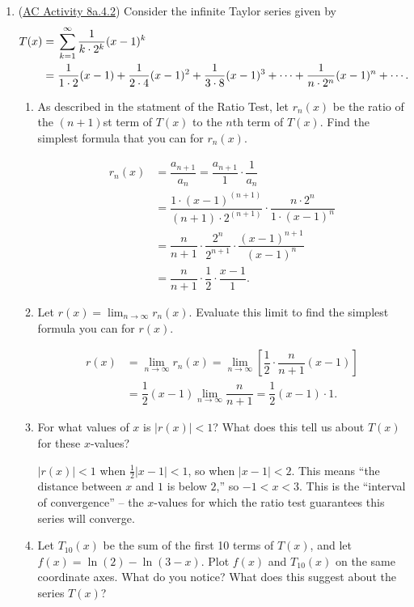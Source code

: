 \begin{enumerate}[leftmargin=0pt]
\item (\href{https://faculty.gvsu.edu/boelkinm/Home/ACS/sec-8a-4-taylor-series.html#act-8a-4-1}{AC Activity 8a.4.2}) Consider the infinite Taylor series given by
\begin{align*}
    T(x) =\mathstrut & \sum_{k = 1}^{\infty} \frac{1}{k \cdot 2^k}(x-1)^k\\
    =\mathstrut & \frac{1}{1 \cdot 2}(x-1) + \frac{1}{2 \cdot 4}(x-1)^2 + \frac{1}{3 \cdot 8}(x-1)^3 + \cdots + \frac{1}{n \cdot 2^n}(x-1)^n + \cdots\text{.}
\end{align*}
\begin{enumerate}
    \item As described in the statment of the Ratio Test, let $r_n(x)$ be the ratio of the $(n+1)$st term of $T(x)$ to the $n$th term of $T(x)$. Find the simplest formula that you can for $r_n(x)$.
    \begin{red}
        \begin{align*}
            r_n(x) &= \dfrac{a_{n+1}}{a_n} = \dfrac{a_{n+1}}{1} \cdot \dfrac{1}{a_n} \\
            &= \dfrac{1 \cdot (x-1)^{(n+1)}}{(n+1) \cdot 2^{(n+1)}} \cdot \dfrac{n \cdot 2^n}{1\cdot (x-1)^n} \\
            &= \dfrac{n}{n+1} \cdot \dfrac{2^n}{2^{n+1}} \cdot \dfrac{(x-1)^{n+1}}{(x-1)^n} \\
            &= \dfrac{n}{n+1} \cdot \dfrac{1}{2} \cdot \dfrac{x-1}{1}.
        \end{align*}
    \end{red}
    \item Let $r(x) = \displaystyle\lim_{n\to\infty} r_n(x)$. Evaluate this limit to find the simplest formula you can for $r(x)$.
    \begin{red}
        \begin{align*}
            r(x) &= \displaystyle\lim_{n\to\infty} r_n(x) = \lim_{n\to\infty}\left[\dfrac{1}{2}\cdot \dfrac{n}{n+1} (x-1)\right] \\
            &= \dfrac{1}{2}(x-1) \lim_{n\to\infty} \dfrac{n}{n+1} = \dfrac{1}{2}(x-1)\cdot 1.
        \end{align*}
    \end{red}
    \item For what values of $x$ is $|r(x)| < 1$? What does this tell us about $T(x)$ for these $x$-values?

    \begin{red}
        $|r(x)| < 1$ when $\tfrac12 |x-1| < 1$, so when $|x-1| <2$. This means ``the distance between $x$ and $1$ is below $2$,'' so $-1 < x < 3$. This is the ``interval of convergence'' -- the $x$-values for which the ratio test guarantees this series will converge.
    \end{red}
    \item Let $T_{10}(x)$ be the sum of the first 10 terms of $T(x)$, and let $f(x) = \ln(2) - \ln(3-x)$. Plot $f(x)$ and $T_{10}(x)$ on the same coordinate axes. What do you notice? What does this suggest about the series $T(x)$?
\end{enumerate}


\end{enumerate}
